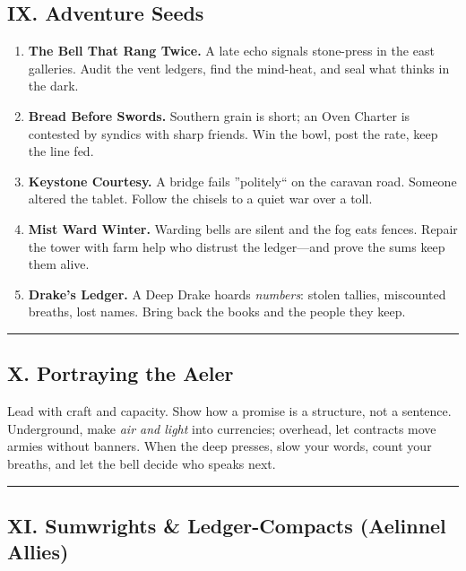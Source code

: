 \documentclass[11pt]{article}
\begin{document}
\subsection{IX. Adventure Seeds}

\begin{enumerate}[leftmargin=*]
  \item \textbf{The Bell That Rang Twice.} A late echo signals stone-press in the east galleries. Audit the vent ledgers, find the mind-heat, and seal what thinks in the dark.
  \item \textbf{Bread Before Swords.} Southern grain is short; an Oven Charter is contested by syndics with sharp friends. Win the bowl, post the rate, keep the line fed.
  \item \textbf{Keystone Courtesy.} A bridge fails ''politely`` on the caravan road. Someone altered the tablet. Follow the chisels to a quiet war over a toll.
  \item \textbf{Mist Ward Winter.} Warding bells are silent and the fog eats fences. Repair the tower with farm help who distrust the ledger---and prove the sums keep them alive.
  \item \textbf{Drake's Ledger.} A Deep Drake hoards \emph{numbers}: stolen tallies, miscounted breaths, lost names. Bring back the books and the people they keep.
\end{enumerate}

\medskip\hrule\medskip

\subsection{X. Portraying the Aeler}

Lead with craft and capacity. Show how a promise is a structure, not a sentence. Underground, make \emph{air and light} into currencies; overhead, let contracts move armies without banners. When the deep presses, slow your words, count your breaths, and let the bell decide who speaks next.

\medskip\hrule\medskip

\subsection{XI. Sumwrights \& Ledger-Compacts (Aelinnel Allies)}
\end{document}
